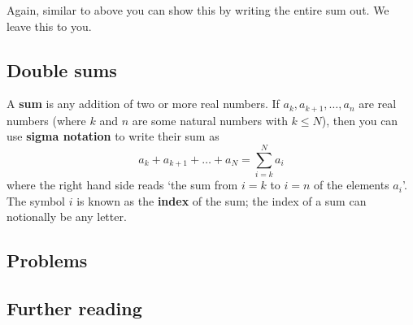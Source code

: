 \documentclass[
  12pt,
  a4paper, oneside]{starmastarticle}
\begin{document}
Again, similar to above you can show this by writing the entire sum out.
We leave this to you.

\begin{tcolorbox}[enhanced jigsaw, left=2mm, colframe=quarto-callout-note-color-frame, toprule=.15mm, bottomrule=.15mm, opacityback=0, colback=white, arc=.35mm, leftrule=.75mm, breakable, rightrule=.15mm]
\begin{minipage}[t]{5.5mm}
\textcolor{quarto-callout-note-color}{\faInfo}
\end{minipage}%
\begin{minipage}[t]{\textwidth - 5.5mm}

\end{minipage}%
\end{tcolorbox}

\hypertarget{double-sums}{%
\subsection{Double sums}\label{double-sums}}

\begin{tcolorbox}[enhanced jigsaw, left=2mm, colframe=quarto-callout-note-color-frame, toprule=.15mm, bottomrule=.15mm, opacityback=0, colback=white, arc=.35mm, leftrule=.75mm, breakable, rightrule=.15mm]
\begin{minipage}[t]{5.5mm}
\textcolor{quarto-callout-note-color}{\faInfo}
\end{minipage}%
\begin{minipage}[t]{\textwidth - 5.5mm}
A \textbf{sum} is any addition of two or more real numbers. If
\(a_k,a_{k+1}, \ldots, a_n\) are real numbers (where \(k\) and \(n\) are
some natural numbers with \(k\leq N\)), then you can use \textbf{sigma
notation} to write their sum as
\[a_k + a_{k+1} + \ldots + a_N = \sum_{i = k}^N a_i\] where the right
hand side reads `the sum from \(i = k\) to \(i = n\) of the elements
\(a_i\)'. The symbol \(i\) is known as the \textbf{index} of the sum;
the index of a sum can notionally be any letter.\end{minipage}%
\end{tcolorbox}

\hypertarget{problems}{%
\subsection{Problems}\label{problems}}

\hypertarget{further-reading}{%
\subsection{Further reading}\label{further-reading}}
\end{document}
